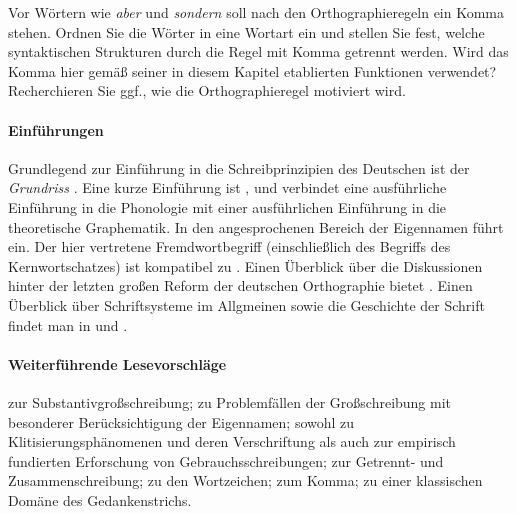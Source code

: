 \Uebung[\tristar] \label{u154} Vor Wörtern wie \textit{aber} und \textit{sondern} soll nach den Orthographieregeln ein Komma stehen.
Ordnen Sie die Wörter in eine Wortart ein und stellen Sie fest, welche syntaktischen Strukturen durch die Regel mit Komma getrennt werden.
Wird das Komma hier gemäß seiner in diesem Kapitel etablierten Funktionen verwendet?
Recherchieren Sie ggf., wie die Orthographieregel motiviert wird.

\WeitereLiteratur

\paragraph*{Einführungen}

\begin{sloppypar}

Grundlegend zur Einführung in die Schreibprinzipien des Deutschen ist der \textit{Grundriss} \citep[Kapitel~8]{Eisenberg1}.
Eine kurze Einführung ist \citet{Fuhrhop2009}, und \citet{FuhrhopPeters2013} verbindet eine ausführliche Einführung in die Phonologie mit einer ausführlichen Einführung in die theoretische Graphematik.
In den angesprochenen Bereich der Eigennamen führt \citet{NueblingEa2012} ein.
Der hier vertretene Fremdwortbegriff (einschließlich des Begriffs des Kernwortschatzes) ist kompatibel zu \citet{Eisenberg2012}.
Einen Überblick über die Diskussionen hinter der letzten großen Reform der deutschen Orthographie bietet \citet{AugstEa1997}.
Einen Überblick über Schriftsysteme im Allgmeinen sowie die Geschichte der Schrift findet man in \citet{Duerscheid2012a} und \citet{Coulmas1989}.

\paragraph*{Weiterführende Lesevorschläge}
\citet{Gallmann1995} zur Substantivgroßschreibung;
\citet{Eisenberg1981} zu Problemfällen der Großschreibung mit besonderer Berücksichtigung der Eigennamen;
\citet{SchaeferSayatz2014} sowohl zu Klitisierungsphänomenen und deren Verschriftung als auch zur empirisch fundierten Erforschung von Gebrauchsschreibungen;
\citet{Jacobs2005} zur Getrennt- und Zusammenschreibung;
\citet{Buchmann2015} zu den Wortzeichen;
\citet{Primus1993} zum Komma;
\citet{Primus2008} zu einer klassischen Domäne des Gedankenstrichs.
\end{sloppypar}
